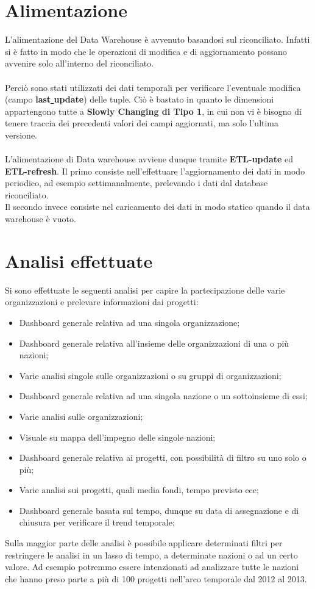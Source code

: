 \documentclass[12pt,a4paper]{report}
\begin{document}
\section*{Alimentazione}
L'alimentazione del Data Warehouse è avvenuto basandosi sul riconciliato. Infatti si è fatto in modo che le operazioni di modifica e di aggiornamento possano avvenire solo all'interno del riconciliato.
\\\\
\noindent Perciò sono stati utilizzati dei dati temporali per verificare l'eventuale modifica (campo \textbf{last\underline{ }update}) delle tuple. Ciò è bastato in quanto le dimensioni appartengono tutte a \textbf{Slowly Changing di Tipo 1}, in cui non vi è bisogno di tenere traccia dei precedenti valori dei campi aggiornati, ma solo l'ultima versione.
\\\\\noindent
L'alimentazione di Data warehouse avviene dunque tramite \textbf{ETL-update} ed \textbf{ETL-refresh}. Il primo consiste nell'effettuare l'aggiornamento dei dati in modo periodico, ad esempio settimanalmente, prelevando i dati dal database riconciliato.\\
Il secondo invece consiste nel caricamento dei dati in modo statico quando il data warehouse è vuoto.\newpage
\section*{Analisi effettuate}
Si sono effettuate le seguenti analisi per capire la partecipazione delle varie organizzazioni e prelevare informazioni dai progetti:
\begin{itemize}
	\item Dashboard generale relativa ad una singola organizzazione;
	\item Dashboard generale relativa all'insieme delle organizzazioni di una o più nazioni;
	\item Varie analisi singole sulle organizzazioni o su gruppi di organizzazioni;
	\item Dashboard generale relativa ad una singola nazione o un sottoinsieme di essi;
	\item Varie analisi sulle organizzazioni;
	\item Visuale su mappa dell'impegno delle singole nazioni;
	\item Dashboard generale relativa ai progetti, con possibilità di filtro su uno solo o più;
	\item Varie analisi sui progetti, quali media fondi, tempo previsto ecc;
	\item Dashboard generale basata sul tempo, dunque su data di assegnazione e di chiusura per verificare il trend temporale;
\end{itemize}
Sulla maggior parte delle analisi è possibile applicare determinati filtri per restringere le analisi in un lasso di tempo, a determinate nazioni o ad un certo valore. Ad esempio potremmo essere intenzionati ad analizzare tutte le nazioni che hanno preso parte a più di 100 progetti nell'arco temporale dal 2012 al 2013.
\end{document}

